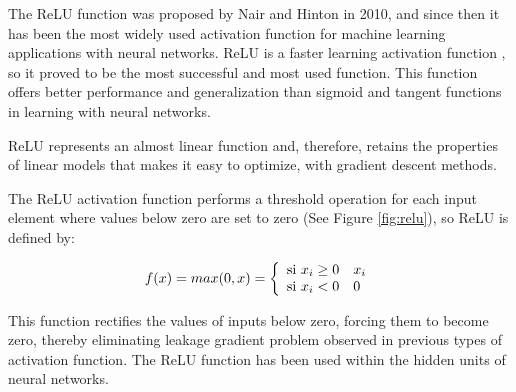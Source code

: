 The ReLU function was proposed by Nair and Hinton in 2010, and since then it has been the most widely used activation function for machine learning applications with neural networks. ReLU is a faster learning activation function \cite{Reference46}, so it proved to be the most successful and most used function. This function offers better performance and generalization than sigmoid and tangent functions in learning with neural networks.

\vspace{5mm} %

ReLU represents an almost linear function and, therefore, retains the properties of linear models that makes it easy to optimize, with gradient descent methods.

\vspace{5mm} %

The ReLU activation function performs a threshold operation for each input element where values below zero are set to zero (See Figure \ref{fig:relu}), so ReLU is defined by:

\begin{equation}
f(x) = max(0,x) = \left\lbrace
\begin{array}{ll}
\textup{si } x_{i}\geq0 & x_{i}\\
\textup{si } x_{i} < 0 & 0
\end{array}
\right.
\end{equation}

This function rectifies the values of inputs below zero, forcing them to become zero, thereby eliminating leakage gradient problem observed in previous types of activation function. The ReLU function has been used within the hidden units of neural networks.


